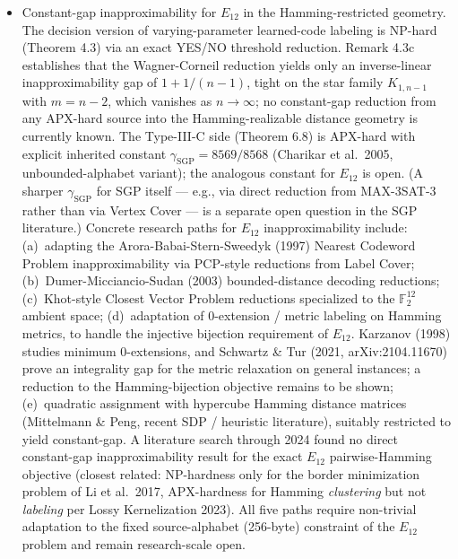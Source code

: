 \documentclass[
]{article}
\begin{document}
\begin{itemize}
  membership oracle is NP-hard to construct (e.g., satisfying
  assignments of a fixed SAT instance), which fall outside
  Theorem 5.5's reach for fundamental complexity-theoretic reasons.
\item
  Constant-gap inapproximability for $E_{12}$ in the
  Hamming-restricted geometry. The decision version of
  varying-parameter learned-code labeling is NP-hard (Theorem 4.3)
  via an exact YES/NO threshold reduction. Remark 4.3c establishes
  that the Wagner-Corneil reduction yields only an inverse-linear
  inapproximability gap of $1 + 1/(n-1)$, tight on the star family
  $K_{1, n-1}$ with $m = n - 2$, which vanishes as $n \to \infty$;
  no constant-gap reduction from any APX-hard source into the
  Hamming-realizable distance geometry is currently known. The Type-III-C side (Theorem 6.8) is
  APX-hard with explicit inherited constant
  $\gamma_{\mathrm{SGP}} = 8569/8568$ (Charikar et al.\ 2005,
  unbounded-alphabet variant); the analogous constant for $E_{12}$
  is open. (A sharper $\gamma_{\mathrm{SGP}}$ for SGP itself ---
  e.g., via direct reduction from MAX-3SAT-3 rather than via Vertex
  Cover --- is a separate open question in the SGP literature.)
  Concrete research paths for $E_{12}$ inapproximability include:
  (a)~adapting the Arora-Babai-Stern-Sweedyk (1997) Nearest
  Codeword Problem inapproximability via PCP-style reductions from
  Label Cover; (b)~Dumer-Micciancio-Sudan (2003) bounded-distance
  decoding reductions; (c)~Khot-style Closest Vector Problem
  reductions specialized to the $\mathbb{F}_2^{12}$ ambient
  space; (d)~adaptation of $0$-extension / metric labeling on
  Hamming metrics, to handle the injective bijection requirement
  of $E_{12}$. Karzanov (1998) studies minimum $0$-extensions, and
  Schwartz \& Tur (2021, arXiv:2104.11670) prove an integrality
  gap for the metric relaxation on general instances; a reduction
  to the Hamming-bijection objective remains to be shown; (e)~quadratic
  assignment with hypercube Hamming distance matrices (Mittelmann \&
  Peng, recent SDP / heuristic literature), suitably restricted to
  yield constant-gap. A literature search through 2024 found no
  direct constant-gap inapproximability result for the exact $E_{12}$
  pairwise-Hamming objective (closest related: NP-hardness only for
  the border minimization problem of Li et al.\ 2017, APX-hardness
  for Hamming \emph{clustering} but not \emph{labeling} per
  Lossy Kernelization 2023). All five paths require non-trivial
  adaptation to the fixed source-alphabet (256-byte) constraint of
  the $E_{12}$ problem and remain research-scale open.


\end{itemize}
\end{document}
